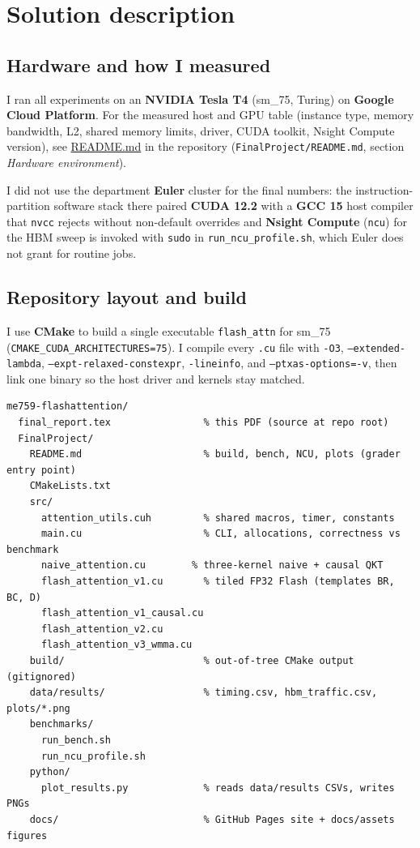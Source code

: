 \documentclass[12pt]{article}
\begin{document}
\section{Solution description}
\label{sec:solution}

\subsection{Hardware and how I measured}
I ran all experiments on an \textbf{NVIDIA Tesla T4} (sm\_75, Turing) on \textbf{Google Cloud Platform}. For the measured host and GPU table (instance type, memory bandwidth, L2, shared memory limits, driver, CUDA toolkit, Nsight Compute version), see \href{https://github.com/batra98/me759-flashattention/blob/main/FinalProject/README.md\#hardware-environment}{README.md} in the repository (\texttt{FinalProject/README.md}, section \emph{Hardware environment}).

I did not use the department \textbf{Euler} cluster for the final numbers: the instruction-partition software stack there paired \textbf{CUDA 12.2} with a \textbf{GCC 15} host compiler that \texttt{nvcc} rejects without non-default overrides and \textbf{Nsight Compute} (\texttt{ncu}) for the HBM sweep is invoked with \texttt{sudo} in \texttt{run\_ncu\_profile.sh}, which Euler does not grant for routine jobs.

\subsection{Repository layout and build}
\label{sec:codestructure}

I use \textbf{CMake} to build a single executable \texttt{flash\_attn} for sm\_75 (\texttt{CMAKE\_CUDA\_ARCHITECTURES=75}). I compile every \texttt{.cu} file with \texttt{-O3}, \texttt{--extended-lambda}, \texttt{--expt-relaxed-constexpr}, \texttt{-lineinfo}, and \texttt{--ptxas-options=-v}, then link one binary so the host driver and kernels stay matched.

\begin{verbatim}
me759-flashattention/
  final_report.tex                % this PDF (source at repo root)
  FinalProject/
    README.md                     % build, bench, NCU, plots (grader entry point)
    CMakeLists.txt
    src/
      attention_utils.cuh         % shared macros, timer, constants
      main.cu                     % CLI, allocations, correctness vs benchmark
      naive_attention.cu        % three-kernel naive + causal QKT
      flash_attention_v1.cu       % tiled FP32 Flash (templates BR, BC, D)
      flash_attention_v1_causal.cu
      flash_attention_v2.cu
      flash_attention_v3_wmma.cu
    build/                        % out-of-tree CMake output (gitignored)
    data/results/                 % timing.csv, hbm_traffic.csv, plots/*.png
    benchmarks/
      run_bench.sh
      run_ncu_profile.sh
    python/
      plot_results.py             % reads data/results CSVs, writes PNGs
    docs/                         % GitHub Pages site + docs/assets figures
\end{verbatim}
\end{document}
